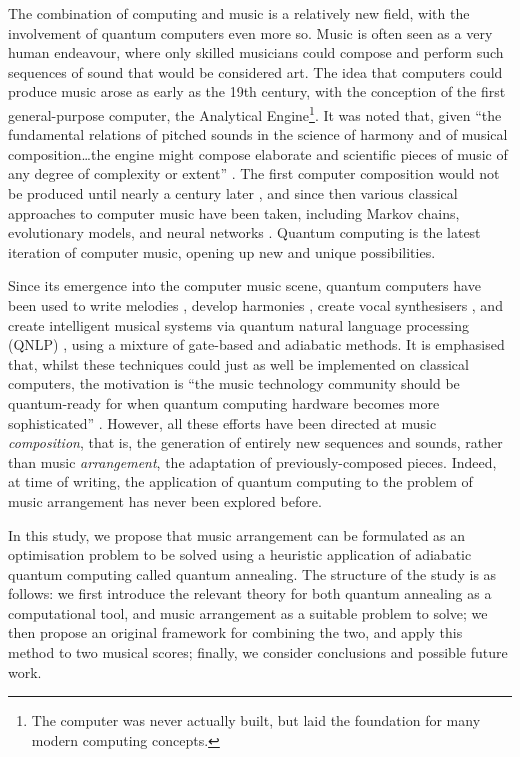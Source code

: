 \documentclass[12pt]{article}
\theoremstyle{definition}
\begin{document}
The combination of computing and music is a relatively new field, with the involvement of quantum computers even more so. Music is often seen as a very human endeavour, where only skilled musicians could compose and perform such sequences of sound that would be considered art. The idea that computers could produce music arose as early as the 19th century, with the conception of the first general-purpose computer, the Analytical Engine\footnote{The computer was never actually built, but laid the foundation for many modern computing concepts.}. It was noted that, given ``the fundamental relations of pitched sounds in the science of harmony and of musical composition\dots the engine might compose elaborate and scientific pieces of music of any degree of complexity or extent'' \cite{lovelace_sketch_1843}. The first computer composition would not be produced until nearly a century later \cite{hiller_experimental_1959}, and since then various classical approaches to computer music have been taken, including Markov chains, evolutionary models, and neural networks \cite{wiggins_composition_1999}. Quantum computing is the latest iteration of computer music, opening up new and unique possibilities.

Since its emergence into the computer music scene, quantum computers have been used to write melodies \cite{miranda_teaching_2022}, develop harmonies \cite{arya_music_2022}, create vocal synthesisers \cite{miranda_quantum_2020}, and create intelligent musical systems via quantum natural language processing (QNLP) \cite{miranda_quantum_2021}, using a mixture of gate-based and adiabatic methods. It is emphasised that, whilst these techniques could just as well be implemented on classical computers, the motivation is ``the music technology community should be quantum-ready for when quantum computing hardware becomes more sophisticated'' \cite{miranda_quantum_2020}. However, all these efforts have been directed at music \emph{composition}, that is, the generation of entirely new sequences and sounds, rather than music \emph{arrangement}, the adaptation of previously-composed pieces. Indeed, at time of writing, the application of quantum computing to the problem of music arrangement has never been explored before.

In this study, we propose that music arrangement can be formulated as an optimisation problem to be solved using a heuristic application of adiabatic quantum computing called quantum annealing.
The structure of the study is as follows: we first introduce the relevant theory for both quantum annealing as a computational tool, and music arrangement as a suitable problem to solve; we then propose an original framework for combining the two, and apply this method to two musical scores; finally, we consider conclusions and possible future work.
\end{document}
